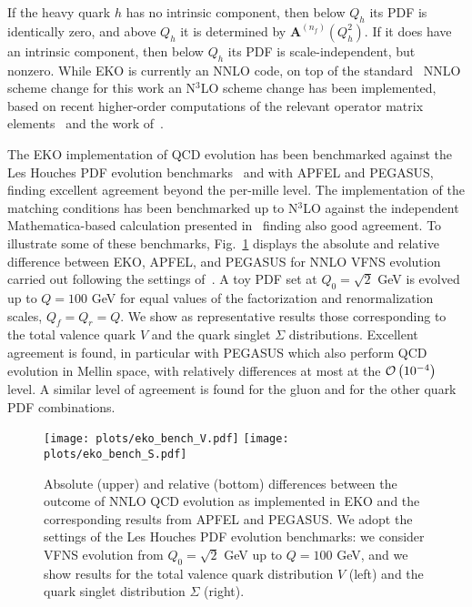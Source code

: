 If the heavy quark $h$ has no intrinsic component, then below $Q_h$
its PDF is identically zero, and above $Q_h$ it is determined by
$\mathbf{A}^{(n_f)}(Q_{h}^2)$. If it does have an intrinsic
component, then  below $Q_h$ its PDF is scale-independent, but nonzero.
While  {\sc\small EKO} is currently an NNLO code, on
top of the standard~\cite{pdfnnlo} NNLO scheme change for this work
an N$^3$LO scheme change has been implemented, based on recent higher-order computations
of the relevant operator matrix elements~\cite{Bierenbaum:2009zt,Bierenbaum:2009mv,Ablinger:2010ty,Ablinger:2014vwa,Ablinger:2014uka,Behring:2014eya,Blumlein:2017wxd,Ablinger_2014,Ablinger:2014nga}
and the work of~.

The  {\sc\small EKO} implementation of QCD evolution has been
benchmarked against the Les Houches PDF evolution
benchmarks~ and with
{\sc\small APFEL} and {\sc\small PEGASUS},
finding excellent agreement beyond the per-mille level.
%
The implementation of the  matching conditions
has been benchmarked up to N$^3$LO against the independent {\sc\small Mathematica}-based calculation 
presented in~ finding also good agreement.
%
To illustrate some of these benchmarks, Fig.~\ref{fig:ic/EKObench} displays
the absolute and relative difference between {\sc\small EKO},
{\sc\small APFEL}, and {\sc\small PEGASUS}
for NNLO VFNS evolution
carried out
following the settings of~.
%
A toy PDF set at $Q_0=\sqrt{2}$ GeV is evolved up to $Q=100$ GeV
for equal values of the factorization and renormalization scales, $Q_f=Q_r=Q$.
%
We show as representative results those corresponding to
the  total valence quark  $V$ 
and the quark singlet $\Sigma$ distributions.
%
Excellent agreement is found, in particular
with {\sc\small PEGASUS} which also perform QCD
evolution in Mellin space, with relatively differences
at most at the $\mathcal{O}\left( 10^{-4}\right)$ level.
%
A similar level of agreement is found
for the gluon and for the other quark PDF combinations.

\begin{figure}[t]
    \begin{center}
        \texttt{[image: plots/eko\_bench\_V.pdf]}
        \texttt{[image: plots/eko\_bench\_S.pdf]}
        \caption{\small Absolute (upper) and relative (bottom) differences between 
        the outcome of NNLO QCD evolution
        as implemented in
        {\sc\small EKO} and the
        corresponding results from {\sc\small APFEL} and {\sc\small PEGASUS}.
We adopt the settings of the Les Houches PDF evolution benchmarks: we
consider  VFNS evolution from $Q_0=\sqrt{2}$ GeV up to $Q=100$ GeV,
and we show  results for the total valence quark distribution $V$ (left)
and the quark singlet distribution $\Sigma$ (right).
      \label{fig:ic/EKObench} }
    \end{center}
\end{figure}


